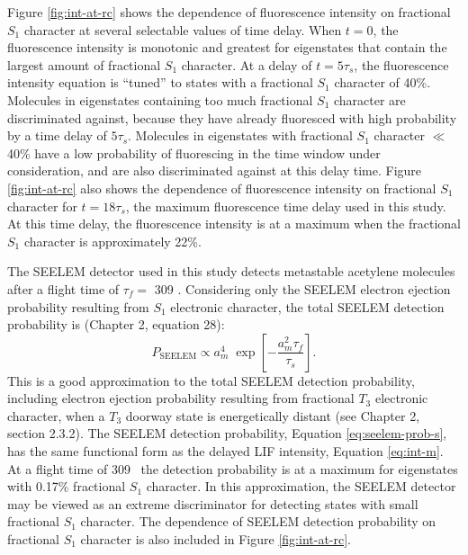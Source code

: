 Figure \ref{fig:int-at-rc} shows the dependence of fluorescence
intensity on fractional $S_1$ character at several selectable values
of time delay.  When $t = 0$, the fluorescence intensity is monotonic
and greatest for eigenstates that contain the largest amount of
fractional $S_1$ character.  At a delay of $t = 5 \tau_s$, the
fluorescence intensity equation is ``tuned'' to states with a
fractional $S_1$ character of 40\%.  Molecules in eigenstates
containing too much fractional $S_1$ character are discriminated
against, because they have already fluoresced with high probability by
a time delay of $5 \tau_s$.  Molecules in eigenstates with fractional
$S_1$ character $\ll$ 40\% have a low probability of fluorescing in
the time window under consideration, and are also discriminated
against at this delay time.  Figure \ref{fig:int-at-rc} also shows the
dependence of fluorescence intensity on fractional $S_1$ character for
$t=18\tau_s$, the maximum fluorescence time delay used in this study.
At this time delay, the fluorescence intensity is at a maximum when
the fractional $S_1$ character is approximately 22\%.

The SEELEM detector used in this study detects metastable acetylene
molecules after a flight time of $\tau_f =$ 309
\microsec.  Considering only the SEELEM electron ejection probability
resulting from $S_1$ electronic character, the total SEELEM detection
probability is (Chapter 2, equation 28):
\begin{equation}
  \label{eq:seelem-prob-s}
  P_{\text{SEELEM}} \propto 
    a_m^4 \; 
    \exp \left [ 
      -\frac{a_m^2 \tau_f}{\tau_s} 
    \right ].
\end{equation}
This is a good approximation to the total SEELEM detection
probability, including electron ejection probability resulting from
fractional $T_3$ electronic character, when a $T_3$ doorway state is
energetically distant (see Chapter 2, section 2.3.2).  The SEELEM
detection probability, Equation \ref{eq:seelem-prob-s}, has the same
functional form as the delayed LIF intensity, Equation \ref{eq:int-m}.
At a flight time of 309 \microsec\, the detection probability is at a
maximum for eigenstates with 0.17\% fractional $S_1$ character.  In
this approximation, the SEELEM detector may be viewed as an extreme
discriminator for detecting states with small fractional $S_1$
character.  The dependence of SEELEM detection probability on
fractional $S_1$ character is also included in Figure
\ref{fig:int-at-rc}.




